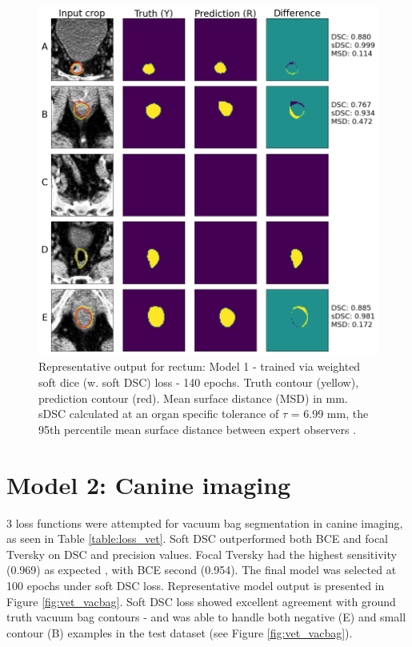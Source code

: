 \begin{figure}[H]
	\begin{center}
		\includegraphics[width=1.0\textwidth]{figures/prostate_rectum}
		\caption{Representative output for rectum: Model 1 - trained via weighted soft dice (w. soft DSC) loss - 140 epochs. Truth contour (yellow), prediction contour (red). Mean surface distance (MSD) in mm. sDSC \cite{Nikolov_2018} calculated at an organ specific tolerance of $\tau$ = 6.99 mm, the 95th percentile mean surface distance between expert observers \cite{Roach_2019}.}
		\label{fig:prostate_rectum}
	\end{center}
\end{figure}

\section{Model 2: Canine imaging}

3 loss functions were attempted for vacuum bag segmentation in canine imaging, as seen in Table \ref{table:loss_vet}. Soft DSC outperformed both BCE and focal Tversky on DSC and precision values. Focal Tversky had the highest sensitivity (0.969) as expected \cite{Khan2019}, with BCE second (0.954). The final model was selected at 100 epochs under soft DSC loss. Representative model output is presented in Figure \ref{fig:vet_vacbag}. Soft DSC loss showed excellent agreement with ground truth vacuum bag contours - and was able to handle both negative (E) and small contour (B) examples in the test dataset (see Figure \ref{fig:vet_vacbag}).

